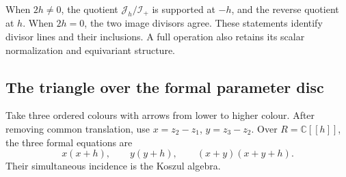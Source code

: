 When \(2h\ne0\), the quotient \(\mathcal J_h/\mathcal I_+\)
is supported at \(-h\), and the reverse quotient at
\(h\). When \(2h=0\), the two image divisors agree.
These statements identify divisor lines and their
inclusions. A full operation also retains its scalar
normalization and equivariant structure.

\subsection{The triangle over the formal parameter disc}

Take three ordered colours with arrows from lower to
higher colour. After removing common translation,
use \(x=z_2-z_1\), \(y=z_3-z_2\). Over
\(R=\mathbb C[[h]]\), the three formal equations are
\begin{equation}\label{cyidx:eq:shifted-equations}
 x(x+h),\qquad y(y+h),\qquad(x+y)(x+y+h).
\end{equation}
Their simultaneous incidence is the Koszul algebra.

